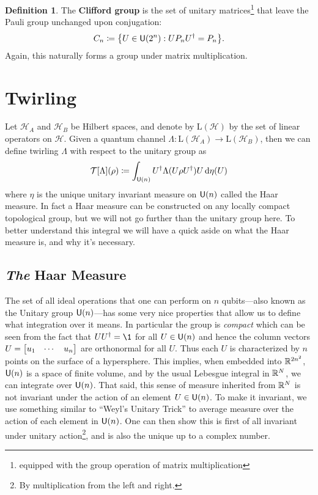 \documentclass[11pt,english]{article}
\theoremstyle{definition}
\newtheorem{definition}{Definition}[section]
\begin{document}
\begin{definition}
  The \textbf{Clifford group} is the set of unitary matrices\footnote{equipped with the group operation of matrix multiplication} that leave the Pauli group unchanged upon conjugation:
  \begin{equation}
    C_n\coloneqq \qty{U\in\mathsf{U}(2^n) : UP_n U^\dagger = P_n}.
  \end{equation}
  Again, this naturally forms a group under matrix multiplication.
\end{definition}

\section{Twirling}

Let $\mathcal{H}_A$ and $\mathcal{H}_B$ be Hilbert spaces, and denote by $\mathrm{L}(\mathcal{H})$ by the set of linear operators on $\mathcal{H}$.
Given a quantum channel $\Lambda: \mathrm{L}(\mathcal{H}_A)\to\mathrm{L}(\mathcal{H}_B)$, then we can define twirling $\Lambda$ with respect to the unitary group as
\begin{equation}
  \mathcal{T}[\Lambda](\rho)\coloneqq \int_{\mathsf{U}(n)}U^\dagger\Lambda(U\rho U^\dagger)U\dd{\eta(U)}
\end{equation}
where $\eta$ is the unique unitary invariant measure on $\mathsf{U}(n)$ called the Haar measure.
In fact a Haar measure can be constructed on any locally compact topological group, but we will not go further than the unitary group here.
To better understand this integral we will have a quick aside on what the Haar measure is, and why it's necessary.

\subsection{\emph{The} Haar Measure}
The set of all ideal operations that one can perform on $n$ qubits---also known as the Unitary group $\mathsf{U}(n)$---has some very nice properties that allow us to define what integration over it means.
In particular the group is \emph{compact} which can be seen from the fact that $UU^\dagger = \1$ for all $U\in\mathsf{U}(n)$ and hence the column vectors $U = \mqty[u_1 & \cdots & u_n]$ are orthonormal for all $U$.
Thus each $U$ is characterized by $n$ points on the surface of a hypersphere.
This implies, when embedded into $\mathbb{R}^{2n^2}$, $\mathsf{U}(n)$ is a space of finite volume, and by the usual Lebesgue integral in $\mathbb{R}^N$, we can integrate over $\mathsf{U}(n)$.
That said, this sense of measure inherited from $\mathbb{R}^N$ is not invariant under the action of an element $U\in\mathsf{U}(n)$.
To make it invariant, we use something similar to ``Weyl's Unitary Trick'' to average measure over the action of each element in $\mathsf{U}(n)$.
One can then show this is first of all invariant under unitary action\footnote{By multiplication from the left and right.}, and is also the unique up to a complex number.
\end{document}
